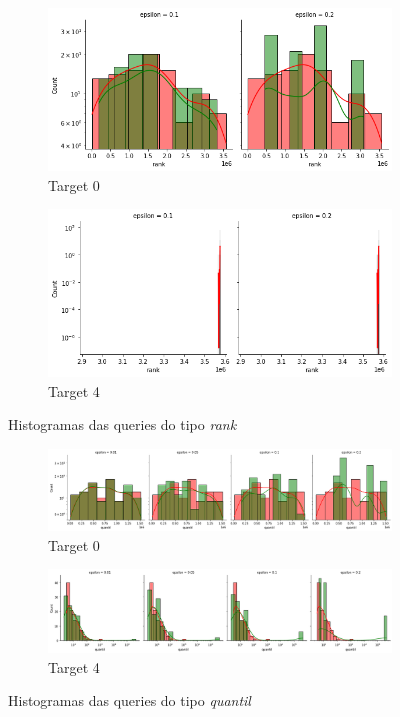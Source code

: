 \documentclass[11pt]{article}
\begin{document}
\begin{figure}[H]
\begin{subfigure}{.5\textwidth}
  \centering
  \includegraphics[width=.9\linewidth]{../../img/RANK_histograma_RANK_t_0.png}
  \caption{Target 0}
  \label{fig:sub-first}
\end{subfigure}
\begin{subfigure}{.5\textwidth}
  \centering
  \includegraphics[width=.9\linewidth]{../../img/RANK_histograma_RANK_t_4.png}
  \caption{Target 4}
\end{subfigure}
\caption{Histogramas das queries do tipo \emph{rank}}
\end{figure}

\begin{figure}[H]
\begin{subfigure}{.5\textwidth}
  \centering
  \includegraphics[width=.9\linewidth]{../../img/QUANTIL_histograma_distrib_QUANTIL_t_0.png}
  \caption{Target 0}
  \label{fig:sub-first}
\end{subfigure}
\begin{subfigure}{.5\textwidth}
  \centering
  \includegraphics[width=.9\linewidth]{../../img/QUANTIL_histograma_distrib_QUANTIL_t_4.png}
  \caption{Target 4}
\end{subfigure}
\caption{Histogramas das queries do tipo \emph{quantil}}
\end{figure}
\end{document}
